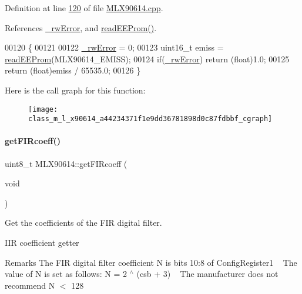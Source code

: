 Definition at line \mbox{\hyperlink{_m_l_x90614_8cpp_source_l00120}{120}} of file \mbox{\hyperlink{_m_l_x90614_8cpp_source}{M\+L\+X90614.\+cpp}}.



References \mbox{\hyperlink{_m_l_x90614_8h_source_l00146}{\+\_\+rw\+Error}}, and \mbox{\hyperlink{_m_l_x90614_8cpp_source_l00344}{read\+E\+E\+Prom()}}.


\begin{DoxyCode}
00120                                   \{
00121 
00122     \mbox{\hyperlink{class_m_l_x90614_a8c203cc9359c283d07682ba7dbcc5de3}{\_rwError}} = 0;
00123     uint16\_t emiss = \mbox{\hyperlink{class_m_l_x90614_aab0a010875527f4ac3d2794017624b10}{readEEProm}}(MLX90614\_EMISS);
00124     \textcolor{keywordflow}{if}(\mbox{\hyperlink{class_m_l_x90614_a8c203cc9359c283d07682ba7dbcc5de3}{\_rwError}}) \textcolor{keywordflow}{return} (\textcolor{keywordtype}{float})1.0;
00125     \textcolor{keywordflow}{return} (\textcolor{keywordtype}{float})emiss / 65535.0;
00126 \}
\end{DoxyCode}
Here is the call graph for this function\+:\nopagebreak
\begin{figure}[H]
\begin{center}
\leavevmode
\texttt{[image: class\_m\_l\_x90614\_a44234371f1e9dd36781898d0c87fdbbf\_cgraph]}
\end{center}
\end{figure}
\mbox{\label{class_m_l_x90614_a8b50c1957a50c7dda5767fe881a7fa95}} 
\paragraph{\texorpdfstring{get\+F\+I\+Rcoeff()}{getFIRcoeff()}}
{\footnotesize\ttfamily uint8\+\_\+t M\+L\+X90614\+::get\+F\+I\+Rcoeff (\begin{DoxyParamCaption}\item[{void}]{ }\end{DoxyParamCaption})}



Get the coefficients of the F\+IR digital filter. 

I\+IR coefficient getter

\begin{DoxyRemark}{Remarks}
The F\+IR digital filter coefficient N is bits 10\+:8 of Config\+Register1 ~\newline
 The value of N is set as follows\+: {\ttfamily N = 2 $^\wedge$ (csb + 3)} ~\newline
 The manufacturer does not recommend {\ttfamily N $<$ 128} 
\end{DoxyRemark}


